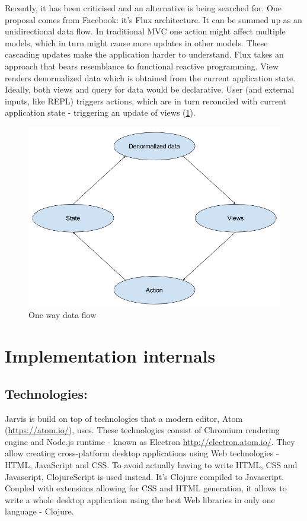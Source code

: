 \documentclass[11pt]{scrartcl}
\begin{document}
Recently, it has been criticised and an alternative is being searched for.
One proposal comes from Facebook: it’s Flux architecture.
It can be summed up as an unidirectional data flow.
In traditional MVC one action might affect multiple models, which in turn might
cause more updates in other models.
These cascading updates make the application harder to understand.
Flux takes an approach that bears resemblance to functional reactive
programming.
View renders denormalized data which is obtained from the current application
state.
Ideally, both views and query for data would be declarative.
User (and external inputs, like REPL) triggers actions, which are in turn
reconciled with current application state - triggering an update of views
(\ref{oneway}).

\begin{figure}[hbt]
  \includegraphics[scale=0.3]{img/OneWay}
  \caption{One way data flow}
  \label{oneway}
\end{figure}

\section{Implementation internals}
\subsection{Technologies:}
Jarvis is build on top of technologies that a modern editor, Atom
(\url{https://atom.io/}), uses.
These technologies consist of Chromium rendering engine and Node.js runtime -
known as Electron \url{http://electron.atom.io/}.
They allow creating cross-platform desktop applications using Web technologies -
HTML, JavaScript and CSS.
To avoid actually having to write HTML, CSS and Javascript, ClojureScript is
used instead.
It’s Clojure compiled to Javascript.
Coupled with extensions allowing for CSS and HTML generation, it allows to write
a whole desktop application using the best Web libraries in only one language -
Clojure.
\end{document}
